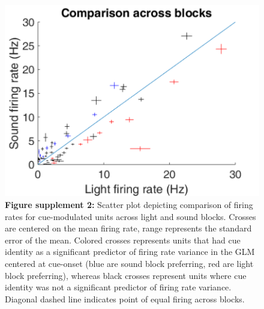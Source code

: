 \documentclass[11pt]{article}
\newcommand{\bsf}[1]{\textbf{#1}}
\begin{document}
\begin{figure}[ht!]
\label{fig:Q1SUPP1}
\end{figure} \clearpage

 \begin{figure}[ht!]
\centering
\includegraphics[height=0.3\textheight]{Fig 5 - SUPP scatter.pdf}
\caption*{\bsf{Figure supplement 2:} {\color{red} Scatter plot depicting comparison
  of firing rates for cue-modulated units across light and sound
  blocks. Crosses are centered on the mean firing rate, range
  represents the standard error of the mean. Colored crosses represents units that had cue
  identity as a significant predictor of firing rate variance in the GLM centered at cue-onset (blue
  are sound block preferring, red are light block preferring), whereas
  black crosses represent units where cue identity was not a
  significant predictor of firing rate variance. Diagonal dashed line
  indicates point of equal firing across blocks.}}
\label{fig:Q1SUPP2}
\end{figure} \clearpage
\end{document}
